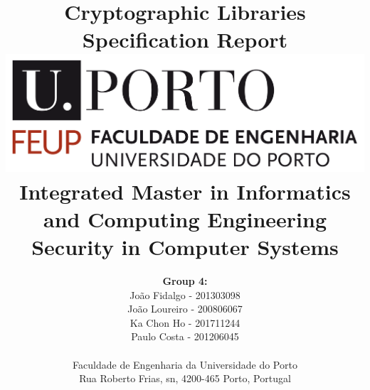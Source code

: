 \documentclass[a4paper]{article}
\begin{document}
\title{\Huge\textbf{Cryptographic Libraries}\linebreak\linebreak\linebreak
\Large\textbf{Specification Report}\linebreak\linebreak
\linebreak\linebreak
\includegraphics[scale=0.1]{feup-logo.png}\linebreak\linebreak
\linebreak\linebreak
\Large{Integrated Master in Informatics and Computing Engineering} \linebreak\linebreak
\Large{Security in Computer Systems}\linebreak
}

\author{\textbf{Group 4:}\\
João Fidalgo - 201303098 \\
João Loureiro - 200806067 \\
Ka Chon Ho - 201711244 \\
Paulo Costa - 201206045 \\
\linebreak\linebreak
 \\ Faculdade de Engenharia da Universidade do Porto \\ Rua Roberto Frias, s\/n, 4200-465 Porto, Portugal \linebreak\linebreak\linebreak
\linebreak\linebreak\vspace{1cm}}

\maketitle
\end{document}
